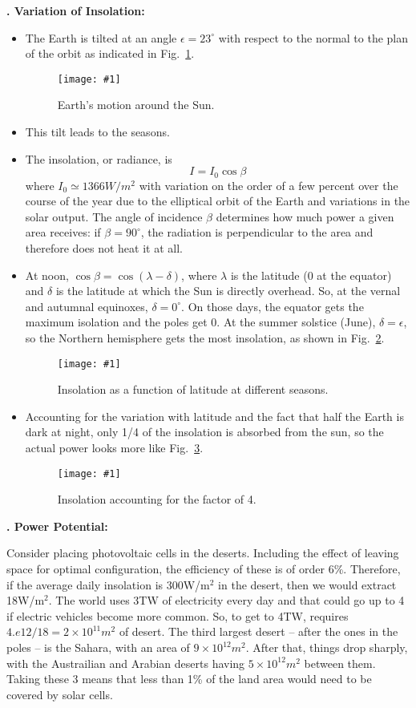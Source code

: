 \documentclass[11pt]{book}
\def\be{\begin{equation}}
\def\ee{\end{equation}}
\newcommand{\sfig}[2]{
\texttt{[image: \#1]}
        }
\newcommand{\Spng}[2]{
   \begin{figure}[thbp]
   \begin{center}
    \sfig{../Figures/#1.png}{0.7\columnwidth}
    \caption{{\small #2}}
    \label{fig:#1}
     \end{center}
   \end{figure}
}
\newcommand{\rf}[1]{\ref{fig:#1}}
\newcommand\bei{\begin{itemize}}
\newcommand\eei{\end{itemize}}
\newcounter{lectureno}
\newcounter{secno}
\newcommand\lsection[1]{
\addtocounter{secno}{1}
{\bf \arabic{lectureno}.\alph{secno} #1:}}
\begin{document}
\lsection{Variation of Insolation}
\bei
\item The Earth is tilted at an angle $\epsilon=23^\circ$ with respect to the normal to the plan of the orbit as indicated in Fig.~\rf{tiltorbit}.
\Spng{tiltorbit}{Earth's motion around the Sun.}
\item This tilt leads to the seasons.
\item The insolation, or radiance, is
\be
I=I_0\cos\beta
\ee
where $I_0\simeq 1366 W/m^2$ with variation on the order of a few percent over the course of the year due to the elliptical orbit of the Earth and variations in the solar output. The angle of incidence $\beta$ determines how much power a given area receives: if $\beta=90^\circ$, the radiation is perpendicular to the area and therefore does not heat it at all. 

\item At noon, $\cos\beta=\cos(\lambda-\delta)$, where $\lambda$ is the latitude (0 at the equator) and $\delta$ is the latitude at which the Sun is directly overhead. So, at the vernal and autumnal equinoxes, $\delta=0^\circ$. On those days, the equator gets the maximum isolation and the poles get 0. At the summer solstice (June), $\delta=\epsilon$, so the Northern hemisphere gets the most insolation, as shown in Fig.~\rf{insolation}.
\Spng{insolation}{Insolation as a function of latitude at different seasons.}
\item Accounting for the variation with latitude and the fact that half the Earth is dark at night, only 1/4 of the insolation is absorbed from the sun, so the actual power looks more like Fig.~\rf{solar5}.
\Spng{solar5}{Insolation accounting for the factor of 4.}
\eei

\lsection{Power Potential}

Consider placing photovoltaic cells in the deserts. Including the effect of leaving space for optimal configuration, the efficiency of these is of order 6\%. Therefore, if the average daily insolation is 300W/m$^2$ in the desert, then we would extract 18W/m$^2$. The world uses 3TW of electricity every day and that could go up to 4 if electric vehicles become more common. So, to get to 4TW, requires $4.e12/18=2\times 10^{11}m^2$ of desert. The third largest desert -- after the ones in the poles -- is the Sahara, with an area of $9\times 10^{12}m^2$. After that, things drop sharply, with the Austrailian and Arabian deserts having $5\times 10^{12}m^2$ between them. Taking these 3 means that less than 1\% of the land area would need to be covered by solar cells.
\end{document}
